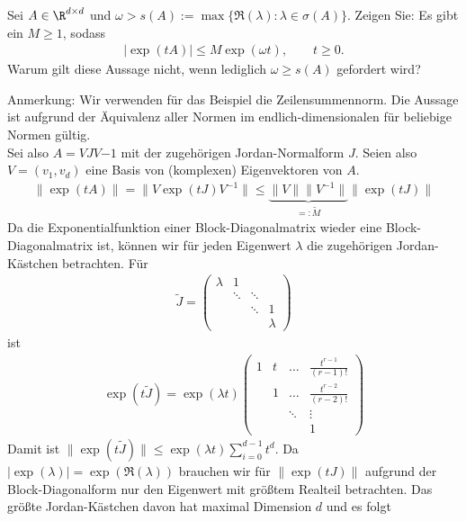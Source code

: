 \begin{exercise}
Sei $A \in \R^{d \times d}$ und $\omega > s(A) := \max \{\Re(\lambda): \lambda \in \sigma(A)\}$.
Zeigen Sie: Es gibt ein $M \geq 1$, sodass
\begin{align*}
  |\exp(tA)| \leq M\exp(\omega t), \qquad t \geq 0.
\end{align*}
Warum gilt diese Aussage nicht, wenn lediglich $\omega \geq s(A)$ gefordert wird?
\end{exercise}
\begin{solution}
Anmerkung: Wir verwenden für das Beispiel die Zeilensummennorm. Die Aussage ist
aufgrund der Äquivalenz aller Normen im endlich-dimensionalen für beliebige Normen gültig. \\
Sei also $A = VJV{-1}$ mit der zugehörigen Jordan-Normalform $J$.
Seien also $V = (v_1,v_d)$ eine Basis von (komplexen) Eigenvektoren von $A$.
\begin{align*}
  \|\exp(tA)\| = \|V\exp(tJ)V^{-1}\| \leq \underbrace{\|V\|\|V^{-1}\|}_{=:\widetilde{M}}\|\exp(tJ)\|
\end{align*}
Da die Exponentialfunktion einer Block-Diagonalmatrix wieder eine Block-Diagonalmatrix ist,
können wir für jeden Eigenwert $\lambda$ die zugehörigen Jordan-Kästchen betrachten.
Für
\begin{align*}
  \widetilde{J} = \begin{pmatrix}
    \lambda & 1 & & \\
    & \ddots & \ddots & \\
    & & \ddots & 1 \\
    & & & \lambda
  \end{pmatrix}
\end{align*}
ist
\begin{align*}
  \exp(t\widetilde{J}) = \exp(\lambda t)\begin{pmatrix}
    1 & t & \dots & \frac{t^{r-1}}{(r-1)!} \\
    & 1 & \dots & \frac{t^{r-2}}{(r-2)!} \\
    & & \ddots & \vdots \\
    & & & 1
  \end{pmatrix}
\end{align*}
Damit ist $\|\exp(t\widetilde{J})\| \leq \exp(\lambda t)\sum_{i=0}^{d-1} t^d$.
Da $|\exp(\lambda)| = \exp(\Re(\lambda))$ brauchen wir für $\|\exp(tJ)\|$
aufgrund der Block-Diagonalform nur den Eigenwert
mit größtem Realteil betrachten. Das größte Jordan-Kästchen davon hat maximal Dimension $d$
und es folgt
\begin{align*}

\end{align*}
\end{solution}
